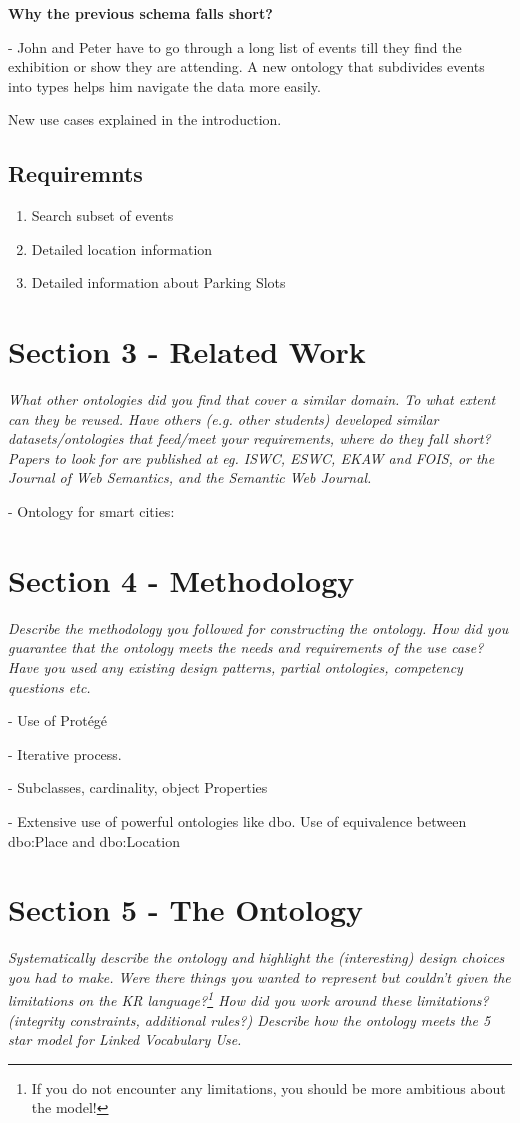 \documentclass[runningheads,a4paper]{../../StyleFiles/llncs}
\begin{document}
\textbf{Why the previous schema falls short?}

- John and Peter have to go through a long list of events till they find the exhibition or show they are attending. A new ontology that subdivides events into types helps him navigate the data more easily. 

New use cases explained in the introduction. 

\subsection{Requiremnts}

\begin{enumerate}
	\item Search subset of events
	\item Detailed location information
	\item Detailed information about Parking Slots
\end{enumerate}


\section{Section 3 - Related Work}
\textit{What other ontologies did you find that cover a similar domain. To what extent can they be reused. Have others (e.g. other students) developed similar datasets/ontologies that feed/meet your requirements, where do they fall short? Papers to look for are published at eg. ISWC, ESWC, EKAW and FOIS, or the Journal of Web Semantics, and the Semantic Web Journal.}

 - Ontology for smart cities: \cite{komninos2015smart}


\section{Section 4 - Methodology}
\textit{Describe the methodology you followed for constructing the ontology. How did you guarantee that the ontology meets the needs and requirements of the use case? Have you used any existing design patterns, partial ontologies, competency questions etc.}

- Use of Protégé

- Iterative process.

- Subclasses, cardinality, object Properties

- Extensive use of powerful ontologies like dbo. Use of equivalence between dbo:Place and dbo:Location

\section{Section 5 - The Ontology}
\textit{Systematically describe the ontology and highlight the (interesting) design choices you had to make. Were there things you wanted to represent but couldn't given the limitations on the KR language?\footnote{If you do not encounter any limitations, you should be more ambitious about the model!} How did you work around these limitations? (integrity constraints, additional rules?) Describe how the ontology meets the 5 star model for Linked Vocabulary Use.}
\end{document}

